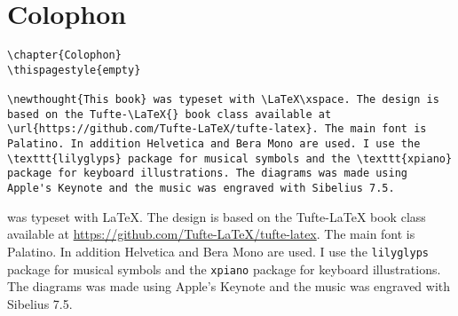 
\chapter{Colophon}
\thispagestyle{empty}

\begin{fullwidth}

\begin{lstlisting}
\chapter{Colophon}
\thispagestyle{empty}

\newthought{This book} was typeset with \LaTeX\xspace. The design is based on the Tufte-\LaTeX{} book class available at \url{https://github.com/Tufte-LaTeX/tufte-latex}. The main font is Palatino. In addition Helvetica and Bera Mono are used. I use the \texttt{lilyglyps} package for musical symbols and the \texttt{xpiano} package for keyboard illustrations. The diagrams was made using Apple's Keynote and the music was engraved with Sibelius 7.5.

\end{lstlisting}

\noindent{} was typeset with \LaTeX\xspace. The design is based on the Tufte-\LaTeX{} book class available at \url{https://github.com/Tufte-LaTeX/tufte-latex}. The main font is Palatino. In addition Helvetica and Bera Mono are used. I use the \texttt{lilyglyps} package for musical symbols and the \texttt{xpiano} package for keyboard illustrations. The diagrams was made using Apple's Keynote and the music was engraved with Sibelius 7.5.

\end{fullwidth}


